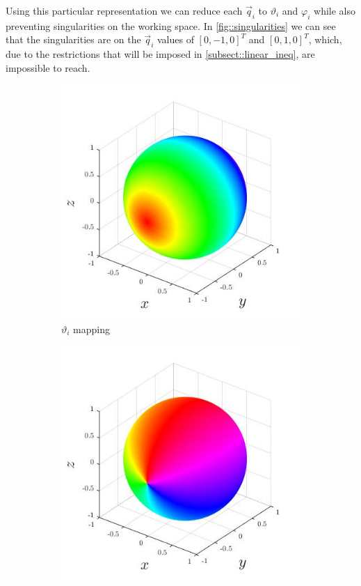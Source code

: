 Using this particular representation we can reduce each $\vec q_i$ to $\vartheta_i$ and $\varphi_i$ while also preventing singularities on the working space. In \cref{fig::singularities} we can see that the singularities are on the $\vec q_i$ values of $[0,-1,0]^T$ and $[0,1,0]^T$, which, due to the restrictions that will be imposed in \cref{subsect::linear_ineq}, are impossible to reach.


\begin{figure}
	\centering
	\begin{subfigure}{0.45\textwidth}
		\centering
		\includegraphics[width=\textwidth]{Figures/th}
		\caption{$\vartheta_i$ mapping}
		\label{subfig::theta_map}
	\end{subfigure}
	\begin{subfigure}{0.45\textwidth}
		\centering
		\includegraphics[width=\textwidth]{Figures/ph}

\end{subfigure}
\end{figure}
